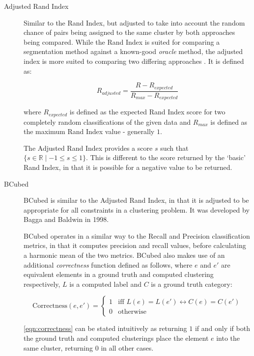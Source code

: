 \documentclass{uvamscse}	%
\begin{document}
\begin{description}
	\item[Adjusted Rand Index]Similar to the Rand Index, but adjusted to take into account the random chance of pairs being assigned to the same cluster by both approaches being compared. While the Rand Index is suited for comparing a segmentation method against a known-good \emph{oracle} method, the adjusted index is more suited to comparing two differing approaches \cite{Matteson2012}. It is defined as:
	
	\begin{equation}
	    R_{adjusted} = \frac{R - R_{expected}}{R_{max} - R_{expected}}
	\end{equation}
	
	where $R_{expected}$ is defined as the expected Rand Index score for two completely random classifications of the given data and $R_{max}$ is defined as the maximum Rand Index value - generally $1$.
	
	The Adjusted Rand Index provides a score $s$ such that $ \{s\in\mathbb{R} \mid -1\leq s \leq 1\} $. This is different to the score returned by the `basic' Rand Index, in that it is possible for a negative value to be returned.
		
	\item[BCubed] BCubed is similar to the Adjusted Rand Index, in that it is adjusted to be appropriate for all constraints in a clustering problem. It was developed by Bagga and Baldwin in 1998.
	
	BCubed operates in a similar way to the Recall and Precision classification metrics, in that it computes precision and recall values, before calculating a harmonic mean of the two metrics. BCubed also makes use of an additional \emph{correctness} function defined as follows, where $e$ and $e'$ are equivalent elements in a ground truth and computed clustering respectively, $L$ is a computed label and $C$ is a ground truth category:
	
	\begin{equation}
	\label{eqn:correctness}
	    \text{Correctness}(e,e') = 
	    \begin{cases}
	        1 & \text{iff $L(e) = L(e') \leftrightarrow C(e) = C(e')$}\\
	        0 & \text{otherwise}
	    \end{cases}
	\end{equation}
	
	\autoref{eqn:correctness} can be stated intuitively as returning $1$ if and only if both the ground truth and computed clusterings place the element $e$ into the same cluster, returning $0$ in all other cases.
	

\end{description}
\end{document}
